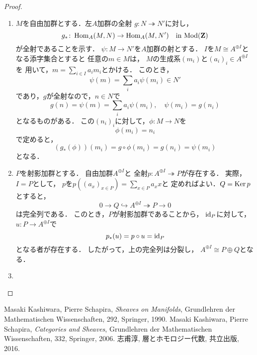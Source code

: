 \begin{proof}
    \begin{enumerate}
        \item \(M\)を自由加群とする．左\(A\)加群の全射
        \(g\colon N\twoheadrightarrow N'\)に対し，\[
            g_\ast\colon\mathop{\mathrm{Hom}}\nolimits_A(M,N)\to\mathop{\mathrm{Hom}}\nolimits_A(M,N') 
            \quad\text{in \(\mathop{\mathrm{Mod}}\nolimits(\mathbf{Z})\)}
        \]が全射であることを示す．
        \(\psi\colon M\to N'\)を\(A\)加群の射とする．
        \(I\)を\(M\cong A^{\oplus I}\)となる添字集合とすると
        任意の\(m\in M\)は，
        \(M\)の生成系\((m_i)\)と\((a_i)_i\in A^{\oplus I}\)を
        用いて，\(m=\sum_{i\in I}a_im_i\)とかける．
        このとき，\[
            \psi(m)=\sum_{i}a_i\psi(m_i)\in N'
        \]であり，\(g\)が全射なので，\(n\in N\)で\[
            g(n)=\psi(m)=\sum_{i}a_i\psi(m_i),
            \quad
            \psi(m_i)=g(n_i)
        \]となるものがある．
        この\((n_i)_i\)に対して，\(\phi\colon M\to N\)を
        \[
            \phi(m_i)=n_i
        \]で定めると，
        \[
            \left(g_\ast(\phi)\right)(m_i)=g\circ\phi(m_i)=g(n_i)=\psi(m_i)
        \]となる．
        \item \(P\)を射影加群とする．
        自由加群\(A^{\oplus I}\)と
        全射\(p\colon A^{\oplus I}\twoheadrightarrow P\)が存在する．
        実際，\(I= P\)として，
        \(p\)を\(p((a_x)_{x\in P})=\sum_{x\in P}a_xx\)と
        定めればよい．\(Q=\mathop{\mathrm{Ker}}\nolimits p\)とすると，\[
            0\to Q\hookrightarrow A^{\oplus I}\twoheadrightarrow P\to0
        \]は完全列である．
        このとき，\(P\)が射影加群であることから，
        \(\mathop{\mathrm{id}}\nolimits_P\)に対して，\(u\colon P\to A^{\oplus I}\)で
        \[p_\ast(u)=p\circ u=\mathop{\mathrm{id}}\nolimits_P\]となる者が存在する．
        したがって，上の完全列は分裂し，
        \(A^{\oplus I}\cong P\oplus Q\)となる．
        \item 
    \end{enumerate}
\end{proof}




\begin{thebibliography}{20} 
     Masaki Kashiwara, Pierre Schapira, 
        \textit{Sheaves on Manifolds}, 
        Grundlehren der Mathematischen Wissenschaften, 292, Springer, 1990.
         Masaki Kashiwara, Pierre Schapira, 
        \textit{Categories and Sheaves}, 
        Grundlehren der Mathematischen Wissenschaften, 332, Springer, 2006.
         志甫淳, 層とホモロジー代数, 共立出版, 2016.
\end{thebibliography}




